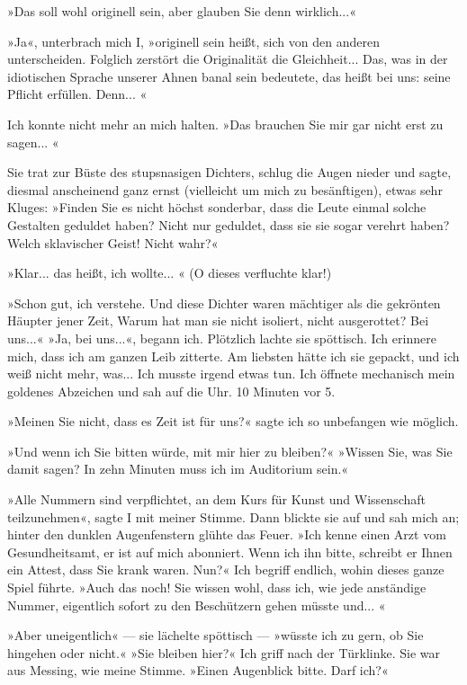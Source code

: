»Das soll wohl originell sein, aber glauben Sie denn wirklich...«

»Ja«, unterbrach mich I, »originell sein heißt, sich von den
anderen unterscheiden. Folglich zerstört die Originalität die
Gleichheit... Das, was in der idiotischen Sprache unserer Ahnen
banal sein bedeutete, das heißt bei uns: seine Pflicht erfüllen.
Denn... «

Ich konnte nicht mehr an mich halten. »Das brauchen Sie mir gar
nicht erst zu sagen... «

Sie trat zur Büste des stupsnasigen Dichters, schlug die Augen
nieder und sagte, diesmal anscheinend ganz ernst (vielleicht um
mich zu besänftigen), etwas sehr Kluges: »Finden Sie es nicht
höchst sonderbar, dass die Leute einmal solche Gestalten geduldet
haben? Nicht nur geduldet, dass sie sie sogar verehrt haben? Welch
sklavischer Geist! Nicht wahr?«

»Klar... das heißt, ich wollte... « (O dieses verfluchte klar!)

»Schon gut, ich verstehe. Und diese Dichter waren mächtiger als die
gekrönten Häupter jener Zeit, Warum hat man sie nicht isoliert,
nicht ausgerottet? Bei uns...« »Ja, bei uns...«, begann ich.
Plötzlich lachte sie spöttisch. Ich erinnere mich, dass ich am
ganzen Leib zitterte. Am liebsten hätte ich sie gepackt, und ich
weiß nicht mehr, was... Ich musste irgend etwas tun. Ich öffnete
mechanisch mein goldenes Abzeichen und sah auf die Uhr. 10 Minuten
vor 5.

»Meinen Sie nicht, dass es Zeit ist für uns?« sagte ich so
unbefangen wie möglich.

»Und wenn ich Sie bitten würde, mit mir hier zu bleiben?« »Wissen
Sie, was Sie damit sagen? In zehn Minuten muss ich im Auditorium
sein.«

»Alle Nummern sind verpflichtet, an dem Kurs für Kunst und
Wissenschaft teilzunehmen«, sagte I mit meiner Stimme. Dann blickte
sie auf und sah mich an; hinter den dunklen Augenfenstern glühte
das Feuer. »Ich kenne einen Arzt vom Gesundheitsamt, er ist auf
mich abonniert. Wenn ich ihn bitte, schreibt er Ihnen ein Attest,
dass Sie krank waren. Nun?« Ich begriff endlich, wohin dieses ganze
Spiel führte. »Auch das noch! Sie wissen wohl, dass ich, wie jede
anständige Nummer, eigentlich sofort zu den Beschützern gehen
müsste und... «

»Aber uneigentlich« — sie lächelte spöttisch — »wüsste ich zu gern,
ob Sie hingehen oder nicht.« »Sie bleiben hier?« Ich griff nach der
Türklinke. Sie war aus Messing, wie meine Stimme. »Einen Augenblick
bitte. Darf ich?«

